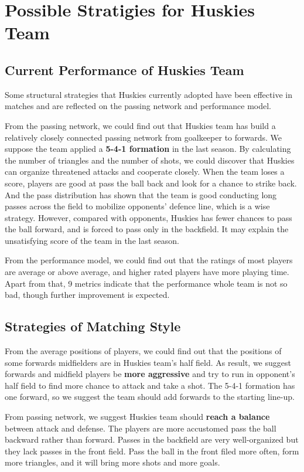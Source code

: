 \documentclass[12pt]{mcmthesis}
\begin{document}
\section{Possible Stratigies for Huskies Team}
\subsection{Current Performance of Huskies Team}
Some structural strategies that Huskies currently adopted have been effective in matches and are reflected on the passing network and performance model.

From the passing network, we could find out that Huskies team has build a relatively closely connected passing network from goalkeeper to forwards. We suppose the team applied a \textbf{5-4-1 formation} in the last season. By calculating the number of triangles and the number of shots, we could discover that Huskies can organize threatened attacks and cooperate closely. When the team loses a score, players are good at pass the ball back and look for a chance to strike back. And the pass distribution has shown that the team is good conducting long passes across the field to mobilize opponents' defence line, which is a wise strategy. However, compared with opponents, Huskies has fewer chances to pass the ball forward, and is forced to pass only in the backfield. It may explain the unsatisfying score of the team in the last season.

From the performance model, we could find out that the ratings of most players are average or above average, and higher rated players have more playing time. Apart from that, 9 metrics indicate that the performance whole team is not so bad, though further improvement is expected.
\subsection{Strategies of Matching Style}
From the average positions of players, we could find out that the positions of some forwards  midfielders are in Huskies team's half field. As result, we suggest forwards and midfield players be \textbf{more aggressive} and try to run in opponent's half field to find more chance to attack and take a shot. The 5-4-1 formation has one forward, so we suggest the team should add forwards to the starting line-up.

From passing network, we suggest Huskies team should \textbf{reach a balance} between attack and defense. The players are more accustomed pass the ball backward rather than forward. Passes in the backfield are very well-organized but they lack passes in the front field. Pass the ball in the front filed more often, form more triangles, and it will bring more shots and more goals.
\end{document}
